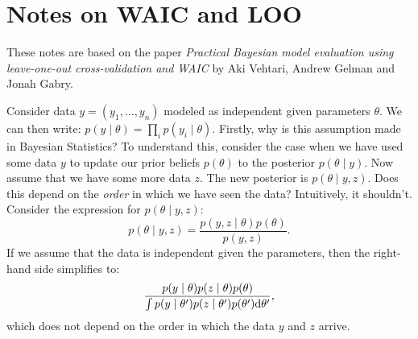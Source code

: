\chapter{Notes on WAIC and LOO}

These notes are based on the paper \emph{Practical Bayesian model evaluation 
using leave-one-out cross-validation and WAIC} by Aki Vehtari, Andrew Gelman and 
Jonah Gabry.

Consider data $y = (y_1, \ldots, y_n)$ modeled as independent given parameters $\theta$. 
We can then write: $p(y \mid \theta) = \prod_{i} p(y_i \mid \theta)$. Firstly, 
why is this assumption made in Bayesian Statistics? To understand this, consider
the case when we have used some data $y$ to update our prior 
beliefs $p(\theta)$ to the posterior $p(\theta \mid y)$. Now assume that we have
some more data $z$. The new posterior is $p(\theta \mid y, z)$. Does this depend
on the \emph{order} in which we have seen the data? Intuitively, it shouldn't. 
Consider the expression for $p(\theta \mid y, z)$:
\[
    p(\theta \mid y, z) = \frac{p(y, z \mid \theta) p(\theta)}{p(y, z)}.
\]
If we assume that the data is independent given the parameters, then the 
right-hand side simplifies to:
\[
    \frac{p(y \mid \theta) p(z \mid \theta) p(\theta)}
    {\int p(y \mid \theta') p(z \mid \theta') p(\theta') \text{d} \theta'},
\]
which does not depend on the order in which the data $y$ and $z$ arrive. 


